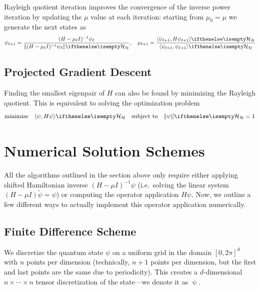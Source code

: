 \documentclass{amsart}
\begin{document}
Rayleigh quotient iteration improves the convergence of the inverse power
iteration by updating the $\mu$ value at each iteration: starting from $\mu_0 =
\mu$ we generate the next states as
\begin{equation}
  \psi_{\ell + 1} = \frac{(H - \mu_\ell I)^{-1} \psi_\ell}{\Norm[\CH]{(H -
  \mu_\ell I)^{-1} \psi_\ell}}, \quad \mu_{\ell + 1} =
  \frac{\InProd[\CH]{\psi_{\ell + 1}}{H \psi_{\ell +
  1}}}{\InProd[\CH]{\psi_{\ell + 1}}{\psi_{\ell + 1}}}
\end{equation}

\subsection{Projected Gradient Descent}

Finding the smallest eigenpair of $H$ can also be found by minimizing the
Rayleigh quotient. This is equivalent to solving the optimization problem
\begin{equation}
  \text{minimize} \quad \InProd[\CH]{\psi}{H \psi} \quad \text{subject to}
  \quad \Norm[\CH]{\psi} = 1
\end{equation}

\section{Numerical Solution Schemes}

All the algorithms outlined in the section above only require either applying
shifted Hamiltonian inverse $(H - \mu I)^{-1}\psi$ (i.e.\ solving the linear
system $(H - \mu I) \tilde{\psi} = \psi$) or computing the operator application
$H \psi$. Now, we outline a few different ways to actually implement this
operator application numerically.

\subsection{Finite Difference Scheme}

We discretize the quantum state $\psi$ on a uniform grid in the domain $[0,
2\pi]^d$ with $n$ points per dimension (technically, $n + 1$ points per
dimension, but the first and last points are the same due to periodicity). This
creates a $d$-dimensional $n \times \cdots \times n$ tensor discretization of
the state---we denote it as $\uppsi$.
\end{document}
